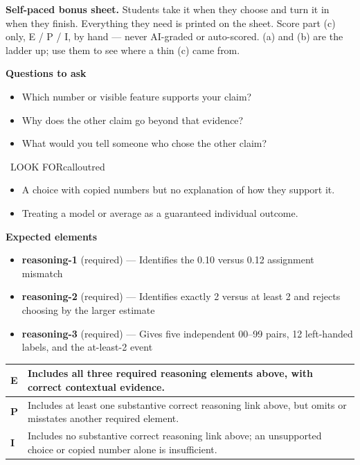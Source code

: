 \documentclass[11pt]{article}
\begin{document}
\textbf{Self-paced bonus sheet.} Students take it when they choose and turn it in when they finish. Everything they need is printed on the sheet. Score part (c) only, E / P / I, by hand --- never AI-graded or auto-scored. (a) and (b) are the ladder up; use them to see where a thin (c) came from.\par

\textbf{Questions to ask}
\begin{itemize}[leftmargin=1.5em,itemsep=2pt,topsep=2pt]
  \item Which number or visible feature supports your claim?
  \item Why does the other claim go beyond that evidence?
  \item What would you tell someone who chose the other claim?
\end{itemize}

\begin{callout}{\IconWarn\ LOOK FOR}{calloutred}
\begin{itemize}[leftmargin=1.5em,itemsep=2pt,topsep=2pt]
  \item A choice with copied numbers but no explanation of how they support it.
  \item Treating a model or average as a guaranteed individual outcome.
\end{itemize}
\end{callout}


\textbf{Expected elements}
\begin{itemize}[leftmargin=1.5em,itemsep=2pt,topsep=2pt]
  \item \textbf{reasoning-1} (required) --- Identifies the 0.10 versus 0.12 assignment mismatch
  \item \textbf{reasoning-2} (required) --- Identifies exactly 2 versus at least 2 and rejects choosing by the larger estimate
  \item \textbf{reasoning-3} (required) --- Gives five independent 00--99 pairs, 12 left-handed labels, and the at-least-2 event
\end{itemize}

{\small\renewcommand{\arraystretch}{1.25}
\noindent\begin{tabular}{|p{0.5in}|p{5.9in}|}
\hline
\textbf{E} & Includes all three required reasoning elements above, with correct contextual evidence. \\ \hline
\textbf{P} & Includes at least one substantive correct reasoning link above, but omits or misstates another required element. \\ \hline
\textbf{I} & Includes no substantive correct reasoning link above; an unsupported choice or copied number alone is insufficient. \\ \hline
\end{tabular}}
\end{document}
